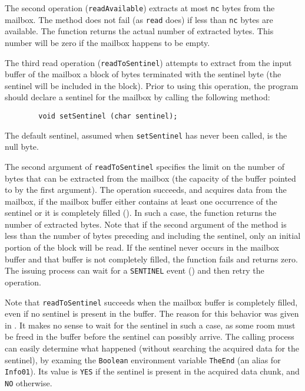 \medskip

The second operation ({\tt readAvailable}) extracts at most {\tt nc}
bytes from the mailbox.
The method does not fail (as {\tt read} does) if less than {\tt nc} bytes
are available.
The function returns the actual number of extracted bytes.
This number will be zero if the mailbox happens to be empty.

\medskip

The third read operation ({\tt readToSentinel}) attempts to extract
from the input buffer of the mailbox a block of bytes terminated with
the sentinel byte (the sentinel will be included in the block).
Prior to using this operation, the program should declare a sentinel for
the mailbox by calling the following method:
\begin{verbatim}
        void setSentinel (char sentinel);
\end{verbatim}
The default sentinel, assumed when {\tt setSentinel} has never been called,
is the null byte.

The second argument of {\tt readToSentinel} specifies the limit on the
number of bytes that can be extracted from the mailbox (the capacity of
the buffer pointed to by the first argument).
The operation succeeds, and acquires data from the mailbox, if
the mailbox buffer either contains at least one occurrence of the sentinel or
it is completely filled ().
In such a case, the function returns the number of extracted bytes.
Note that if the second argument of the method is less than the
number of bytes preceding and including the sentinel, only an initial
portion of the block will be read.
If the sentinel never occurs in the mailbox buffer and that buffer is not
completely filled, the function fails and returns zero.
The issuing
process can wait for a {\tt SENTINEL} event () and then
retry the operation.

Note that {\tt readToSentinel} succeeds when the mailbox buffer is
completely filled, even if no sentinel is present in the buffer.
The reason for this behavior was given in .
It makes no sense to wait for the sentinel in such a case, as some
room must be freed in the buffer before the sentinel can possibly
arrive.
The calling process can easily determine what happened (without searching the
acquired data for the sentinel), by examing the {\tt Boolean}
environment variable {\tt TheEnd} (an alias for {\tt Info01}).
Its value is {\tt YES} if the sentinel is present in the acquired data
chunk, and {\tt NO} otherwise.

